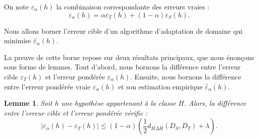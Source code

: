 \documentclass[a4paper,12pt]{article}
\newtheorem{lemma}{Lemme}[section]
\theoremstyle{definition}
\theoremstyle{remark}
\begin{document}
On note $\varepsilon_\alpha(h)$ la combinaison correspondante des erreurs vraies :
\[
\varepsilon_\alpha(h) = \alpha \varepsilon_T(h) + (1 - \alpha)\varepsilon_S(h).
\]

Nous allons borner l’erreur cible d’un algorithme d’adaptation de domaine qui minimise
$\hat{\varepsilon}_\alpha(h)$.

La preuve de cette borne repose sur deux résultats principaux, que nous énonçons sous forme de lemmes.
Tout d’abord, nous bornons la différence entre l’erreur cible $\varepsilon_T(h)$ et l’erreur pondérée
$\varepsilon_\alpha(h)$. Ensuite, nous bornons la différence entre l’erreur pondérée vraie
$\varepsilon_\alpha(h)$ et son estimation empirique $\hat{\varepsilon}_\alpha(h)$.\\


\begin{lemma}
Soit $h$ une hypothèse appartenant à la classe $H$. Alors, la différence entre l’erreur cible
et l’erreur pondérée vérifie :
\[
\left| \varepsilon_\alpha(h) - \varepsilon_T(h) \right|
\leq (1 - \alpha)\left( \frac{1}{2} d_{H \Delta H}(D_S, D_T) + \lambda \right).
\]
\end{lemma}
\end{document}
